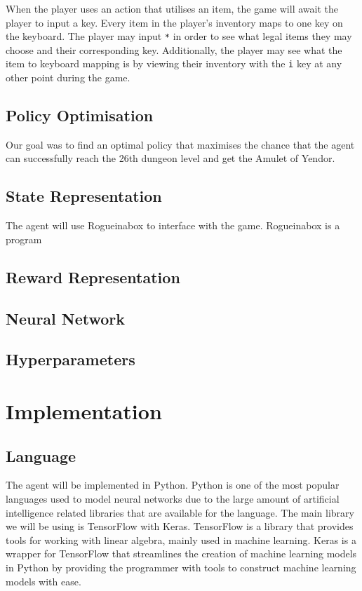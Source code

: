 \documentclass[11pt,a4paper]{article}
\begin{document}
    When the player uses an action that utilises an item, the game will await the player to input a key.
    Every item in the player's inventory maps to one key on the keyboard.
    The player may input \texttt{*} in order to see what legal items they may choose and their corresponding key.
    Additionally, the player may see what the item to keyboard mapping is by viewing their inventory with the \texttt{i} key at any other point during the game.

    \subsection{Policy Optimisation}
    Our goal was to find an optimal policy that maximises the chance that the agent can successfully reach the 26th dungeon level and get the Amulet of Yendor.
    \subsection{State Representation}
    The agent will use Rogueinabox to interface with the game. Rogueinabox is a program
    \subsection{Reward Representation}
    \subsection{Neural Network}

    \subsection{Hyperparameters}




    \section{Implementation}
    \subsection{Language}
    The agent will be implemented in Python.
    Python is one of the most popular languages used to model neural networks due to the large amount of artificial intelligence related libraries that are available for the language.
    The main library we will be using is TensorFlow with Keras.
    TensorFlow is a library that provides tools for working with linear algebra, mainly used in machine learning.
    Keras is a wrapper for TensorFlow that streamlines the creation of machine learning models in Python by providing the programmer with tools to construct machine learning models with ease.
\end{document}
